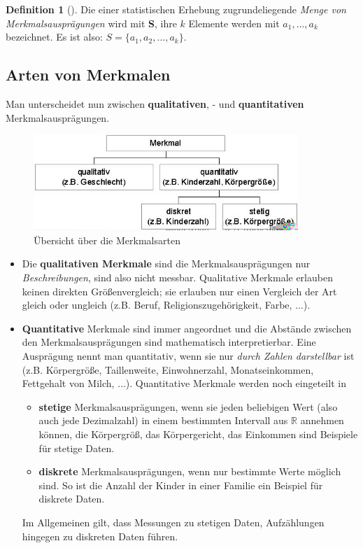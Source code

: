 \documentclass[a4paper, twoside, parskip, 10pt, smallheadings]{scrbook}
\theoremstyle{plain}
\theoremstyle{definition}
\newtheorem{Def}{Definition}%
\newenvironment{fshaded}{%
\def\FrameCommand{\fcolorbox{framecolor}{shadecolor}}%
\MakeFramed {\FrameRestore}}%
{\endMakeFramed}
\newenvironment{fdef}[1][]{\definecolor{shadecolor}{rgb}{1,1,.29}%
\definecolor{framecolor}{rgb}{1,1,0}%
\begin{fshaded}\begin{Def}[#1]}{\end{Def}\end{fshaded}}
\newcommand{\bd}{\begin{fdef}}
\newcommand{\ed}{\end{fdef}}
\begin{document}
\bd  Die einer statistischen Erhebung zugrundeliegende
{\it Menge von Merkmalsauspr\"{a}gungen} wird mit {\bf S}, ihre $k$ Elemente werden mit $a_1, \dots,
a_k$ bezeichnet. Es ist also: $S=\{a_1, a_2, \dots, a_k\}$. \ed



\subsection{Arten von Merkmalen}
Man unterscheidet nun zwischen {\bf qualitativen}, - und {\bf quantitativen}
Merkmalsauspr\"{a}gungen.


 \begin{figure}[htb]
  \begin{center}
    \includegraphics[width=10cm]{2te/beschreibendestatistik/bilder/merkmal1.jpg}
  \caption{\"{U}bersicht \"{u}ber die Merkmalsarten}
  \end{center}
  \end{figure}  

\begin{itemize}
  \item Die {\bf qualitativen Merkmale} sind die Merkmalsauspr\"{a}gungen nur
  {\it Beschreibungen}, sind also nicht messbar. Qualitative Merkmale erlauben keinen direkten Gr\"{o}{\ss}envergleich;
  sie erlauben nur einen Vergleich der Art
  gleich oder ungleich (z.B. Beruf,
Religionszugeh\"{o}rigkeit, Farbe, $\dots$).
  \item {\bf Quantitative}  Merkmale
  sind immer angeordnet und die Abst\"{a}nde zwischen den
  Merkmalsauspr\"{a}gungen sind mathematisch interpretierbar.
   Eine Auspr\"{a}gung nennt man 
quantitativ, wenn sie nur {\it durch Zahlen darstellbar} ist (z.B. K\"{o}rpergr\"{o}{\ss}e, Taillenweite, Einwohnerzahl, Monatseinkommen, Fettgehalt von
Milch, $\dots$). Quantitative Merkmale werden noch
eingeteilt in
   \begin{itemize}
      \item {\bf stetige} Merkmalsauspr\"{a}gungen, wenn sie jeden beliebigen Wert (also auch jede Dezimalzahl) in einem bestimmten
        Intervall aus $\mathbb{R}$ annehmen k\"{o}nnen, die Körpergr\"{o}{\ss}, das Körpergericht, das Einkommen sind Beispiele für stetige Daten.

      \item {\bf diskrete} Merkmalsauspr\"{a}gungen, wenn nur
    bestimmte Werte m\"{o}glich sind. So ist die Anzahl der Kinder in
    einer Familie ein Beispiel f\"{u}r diskrete Daten.
    \end{itemize}
Im Allgemeinen gilt, dass Messungen zu stetigen Daten, Aufz\"{a}hlungen hingegen zu diskreten Daten
f\"{u}hren.
\end{itemize}
\end{document}
